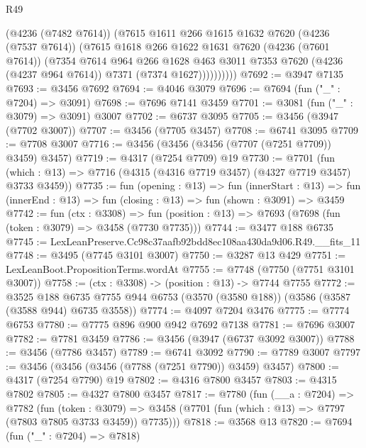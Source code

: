 \begin{lexlean}{R49}
\begin{coremodule}
                (@4236 (@7482 @7614))
                (@7615
                  @1611
                  @266
                  @1615
                  @1632
                  @7620
                  (@4236 (@7537 @7614))
                  (@7615
                    @1618
                    @266
                    @1622
                    @1631
                    @7620
                    (@4236 (@7601 @7614))
                    (@7354
                      @7614
                      @964
                      @266
                      @1628
                      @463
                      @3011
                      @7353
                      @7620
                      (@4236 (@4237 @964 @7614))
                      @7371
                      (@7374 @1627))))))))))
@7692 := @3947 @7135
@7693 := @3456 @7692
@7694 := @4046 @3079
@7696 := @7694 (fun ("_" : @7204) => @3091)
@7698 := @7696 @7141 @3459
@7701 := @3081 (fun ("_" : @3079) => @3091) @3007
@7702 := @6737 @3095
@7705 := @3456 (@3947 (@7702 @3007))
@7707 := @3456 (@7705 @3457)
@7708 := @6741 @3095
@7709 := @7708 @3007
@7716 := @3456 (@3456 (@3456 (@7707 (@7251 @7709)) @3459) @3457)
@7719 := @4317 (@7254 @7709) @19
@7730 := @7701
    (fun (which : @13) => @7716 (@4315 (@4316 @7719 @3457) (@4327 @7719 @3457) @3733 @3459))
@7735 := fun (opening : @13) =>
  fun (innerStart : @13) =>
  fun (innerEnd : @13) => fun (closing : @13) => fun (shown : @3091) => @3459
@7742 := fun (ctx : @3308) =>
  fun (position : @13) => @7693 (@7698 (fun (token : @3079) => @3458 (@7730 @7735)))
@7744 := @3477 @188 @6735
@7745 := LexLeanPreserve.Cc98c37aafb92bdd8ec108aa430da9d06.R49.__fits_11
@7748 := @3495 (@7745 @3101 @3007)
@7750 := @3287 @13 @429
@7751 := LexLeanBoot.PropositionTerms.wordAt
@7755 := @7748 (@7750 (@7751 @3101 @3007))
@7758 := (ctx : @3308) -> (position : @13) -> @7744 @7755
@7772 := @3525
    @188
    @6735
    @7755
    @944
    @6753
    (@3570 (@3580 @188))
    (@3586 (@3587 (@3588 @944) @6735 @3558))
@7774 := @4097 @7204 @3476
@7775 := @7774 @6753
@7780 := @7775 @896 @900 @942 @7692 @7138
@7781 := @7696 @3007
@7782 := @7781 @3459
@7786 := @3456 (@3947 (@6737 @3092 @3007))
@7788 := @3456 (@7786 @3457)
@7789 := @6741 @3092
@7790 := @7789 @3007
@7797 := @3456 (@3456 (@3456 (@7788 (@7251 @7790)) @3459) @3457)
@7800 := @4317 (@7254 @7790) @19
@7802 := @4316 @7800 @3457
@7803 := @4315 @7802
@7805 := @4327 @7800 @3457
@7817 := @7780
    (fun (__a : @7204) =>
    @7782
      (fun (token : @3079) =>
      @3458 (@7701 (fun (which : @13) => @7797 (@7803 @7805 @3733 @3459)) @7735)))
@7818 := @3568 @13
@7820 := @7694 (fun ("_" : @7204) => @7818)

\end{coremodule}
\end{lexlean}
